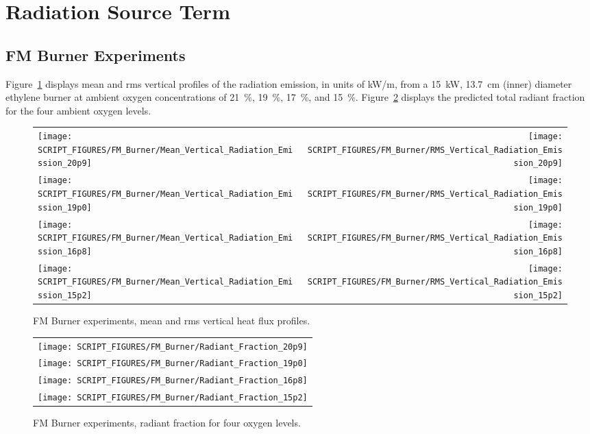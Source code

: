 \clearpage

\section{Radiation Source Term}

\subsection{FM Burner Experiments}
\label{FM_Burner_Heat_Flux_Distribution}

Figure~\ref{FM_Burner_Vertical_Heat_Flux} displays mean and rms vertical profiles of the radiation emission, in units of kW/m, from a 15~kW, 13.7~cm (inner) diameter ethylene burner at ambient oxygen concentrations of 21~\%, 19~\%, 17~\%, and 15~\%. Figure~\ref{FM_Burner_Radiant_Fraction} displays the predicted total radiant fraction for the four ambient oxygen levels.

\begin{figure}[p]
\begin{tabular*}{\textwidth}{l@{\extracolsep{\fill}}r}
\texttt{[image: SCRIPT\_FIGURES/FM\_Burner/Mean\_Vertical\_Radiation\_Emission\_20p9]} &
\texttt{[image: SCRIPT\_FIGURES/FM\_Burner/RMS\_Vertical\_Radiation\_Emission\_20p9]} \\
\texttt{[image: SCRIPT\_FIGURES/FM\_Burner/Mean\_Vertical\_Radiation\_Emission\_19p0]} &
\texttt{[image: SCRIPT\_FIGURES/FM\_Burner/RMS\_Vertical\_Radiation\_Emission\_19p0]} \\
\texttt{[image: SCRIPT\_FIGURES/FM\_Burner/Mean\_Vertical\_Radiation\_Emission\_16p8]} &
\texttt{[image: SCRIPT\_FIGURES/FM\_Burner/RMS\_Vertical\_Radiation\_Emission\_16p8]} \\
\texttt{[image: SCRIPT\_FIGURES/FM\_Burner/Mean\_Vertical\_Radiation\_Emission\_15p2]} &
\texttt{[image: SCRIPT\_FIGURES/FM\_Burner/RMS\_Vertical\_Radiation\_Emission\_15p2]}
\end{tabular*}
\caption[FM Burner experiments, mean and rms vertical heat flux profiles]
{FM Burner experiments, mean and rms vertical heat flux profiles.}
\label{FM_Burner_Vertical_Heat_Flux}
\end{figure}

\begin{figure}[p]
\begin{center}
\begin{tabular}{c}
\texttt{[image: SCRIPT\_FIGURES/FM\_Burner/Radiant\_Fraction\_20p9]} \\
\texttt{[image: SCRIPT\_FIGURES/FM\_Burner/Radiant\_Fraction\_19p0]} \\
\texttt{[image: SCRIPT\_FIGURES/FM\_Burner/Radiant\_Fraction\_16p8]} \\
\texttt{[image: SCRIPT\_FIGURES/FM\_Burner/Radiant\_Fraction\_15p2]}
\end{tabular}
\end{center}
\caption[FM Burner experiments, radiant fraction]
{FM Burner experiments, radiant fraction for four oxygen levels.}
\label{FM_Burner_Radiant_Fraction}
\end{figure}



